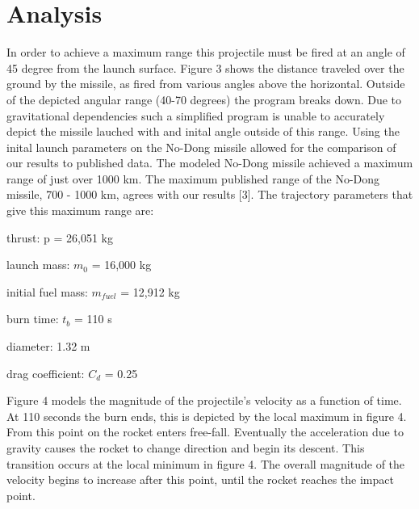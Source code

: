 \documentclass[11pt]{article}
\begin{document}
\section{Analysis}

In order to achieve a maximum range this projectile must be fired at an angle of 45 degree from the launch surface.  
Figure 3 shows the distance traveled over the ground by the missile, as fired from various angles above the horizontal.  
Outside of the depicted angular range (40-70 degrees) the program breaks down.  Due to gravitational dependencies such a 
simplified program is unable to accurately depict the missile lauched with and inital angle outside of this range.  Using the 
inital launch parameters on the No-Dong missile allowed for the comparison of our results to published data.  The modeled No-Dong 
missile achieved a maximum range of just over 1000 km.  The maximum published range of the No-Dong missile, 700 - 1000 km, agrees 
with our results [3].  The trajectory parameters that give this maximum range are:
\begin{center}
 thrust: p = 26,051 kg
\end{center}

\begin{center}
 launch mass: $m_{0}$ = 16,000 kg
\end{center}

\begin{center}
 initial fuel mass: $m_{fuel}$ = 12,912 kg
\end{center}

\begin{center}
 burn time: $t_{b}$ = 110 s
\end{center}

\begin{center}
 diameter: 1.32 m
\end{center}

\begin{center}
 drag coefficient: $C_{d}$ = 0.25
\end{center}



Figure 4 models the magnitude of the projectile's velocity as a function of time.  At 110 seconds the burn ends, this is 
depicted by the local maximum in figure 4.  From this point on the rocket enters free-fall.  Eventually the acceleration 
due to gravity causes the rocket to change direction and begin its descent.  This transition occurs at the local minimum 
in figure 4.  The overall magnitude of the velocity begins to increase after this point, until the rocket reaches the 
impact point.
\end{document}
